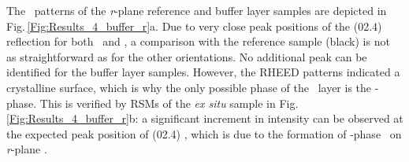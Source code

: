 The \thetaomega\ patterns of the \textit{r}-plane reference and buffer layer samples are depicted in Fig.\,\ref{Fig:Results_4_buffer_r}a.
Due to very close peak positions of the (02.4) reflection for both \cro\ and \agao, a comparison with the reference sample (black) is not as straightforward as for the other orientations.
No additional peak can be identified for the buffer layer samples.
However, the \gls{RHEED} patterns indicated a crystalline surface, which is why the only possible phase of the \gao\ layer is the \textalpha-phase.
This is verified by \glspl{RSM} of the \textit{ex situ} sample in Fig.\,\ref{Fig:Results_4_buffer_r}b:
a significant increment in intensity can be observed at the expected peak position of (02.4) \agao, which is due to the formation of \textalpha-phase \gao\ on \textit{r}-plane \cro.



